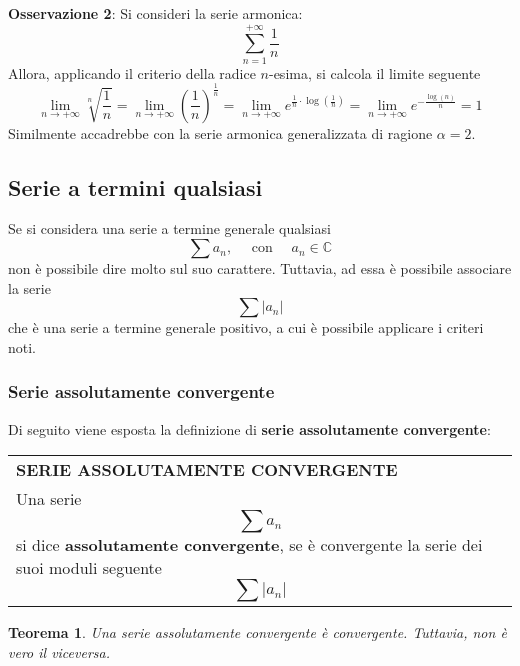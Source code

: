 \documentclass[a4paper]{extarticle}
\newtheorem{theorem}{Teorema}[section]
\renewcommand\arraystretch{}
\begin{document}
\vspace{2em}
\noindent
\textbf{Osservazione 2}: Si consideri la serie armonica:
\[\sum_{n=1}^{+\infty} \frac{1}{n}\]
Allora, applicando il criterio della radice $n$-esima, si calcola il limite seguente
\[\lim_{n \to +\infty} \sqrt[n]{\frac{1}{n}} = \lim_{n \to +\infty} \left(\frac{1}{n}\right)^{\frac{1}{n}} = \lim_{n \to +\infty} e^{\frac{1}{n} \cdot \log \left(\frac{1}{n}\right)} = \lim_{n \to +\infty} e^{-\frac{\log \left(n\right)}{n}} = 1\]
Similmente accadrebbe con la serie armonica generalizzata di ragione $\alpha=2$.

\vspace{1em}
\noindent
\subsection{Serie a termini qualsiasi}
Se si considera una serie a termine generale qualsiasi
\[\sum a_n, \hspace{1em} \text{ con } \hspace{1em} a_n \in \mathbb{C}\]
non è possibile dire molto sul suo carattere. Tuttavia, ad essa è possibile associare la serie
\[\sum \vert a_n \vert\]
che è una serie a termine generale positivo, a cui è possibile applicare i criteri noti.

\vspace{1em}
\subsubsection{Serie assolutamente convergente}
Di seguito viene esposta la definizione di \textbf{serie assolutamente convergente}:

\vspace{1em}
\setlength{\tabcolsep}{14pt}
\renewcommand{\arraystretch}{2}
\noindent
\begin{tabularx}{\textwidth}{@{}|P|@{}}
    \hline
    {\textbf{SERIE ASSOLUTAMENTE CONVERGENTE}}\\
    \parbox{\linewidth}{Una serie
    \[\sum a_n\]
    si dice \textbf{assolutamente convergente}, se è convergente la serie dei suoi moduli seguente
    \[\sum \vert a_n \vert\]
    \vspace{-1mm}}\\
    \hline
\end{tabularx}

\vspace{2em}
\noindent
\begin{theorem}
    Una serie assolutamente convergente è convergente. Tuttavia, non è vero il viceversa.
\end{theorem}
\end{document}
